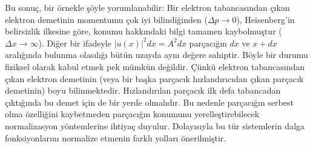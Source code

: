 \documentclass[a4paper,12pt, twoside]{article}
\begin{document}
Bu sonuç, bir örnekle şöyle yorumlanabilir: Bir elektron tabancasından çıkan elektron demetinin momentumu çok iyi bilindiğinden ($\Delta p \rightarrow 0$), Heisenberg'in belirsizlik ilkesine göre, konumu hakkındaki bilgi tamamen kaybolmuştur ($\Delta x \rightarrow \infty$). Diğer bir ifadeyle $|u(x)|^2 dx = A^2 dx$ parçacığın $dx$ ve $x+dx$ aralığında bulunma olasılığı bütün uzayda aynı değere sahiptir. 
Böyle bir durumu fiziksel olarak kabul etmek pek mümkün değildir. Çünkü elektron tabancasından çıkan elektron demetinin (veya bir başka parçacık hızlandırıcıdan çıkan parçacık demetinin) boyu bilinmektedir. Hızlandırılan parçacık ilk defa tabancadan çıktığında bu demet için de bir yerde olmalıdır. Bu nedenle parçacığın serbest olma özelliğini kaybetmeden parçacığın konumunu yerelleştirebilecek normalizasyon yöntemlerine ihtiyaç duyulur. Dolayısıyla bu tür sistemlerin dalga fonksiyonlarını normalize etmenin farklı yolları önerilmiştir.
\end{document}

